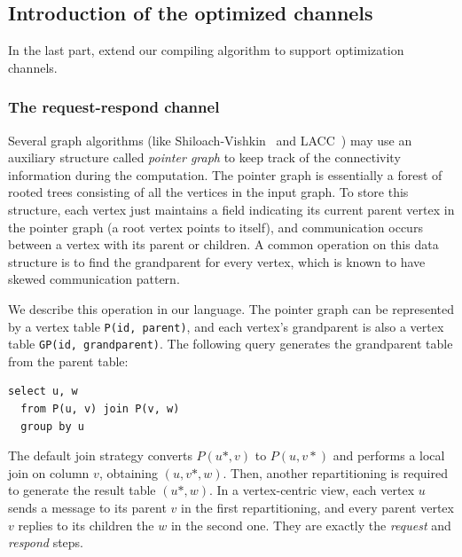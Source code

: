 \documentclass{sokendai_thesis} %
\begin{document}


\subsection{Introduction of the optimized channels}
\label{sec:optimizations}

In the last part, extend our compiling algorithm to support optimization channels.

\subsubsection{The request-respond channel}

Several graph algorithms (like Shiloach-Vishkin~\cite{ShVi82} and LACC~\cite{lacc}) may use an auxiliary structure called \emph{pointer graph} to keep track of the connectivity information during the computation.
The pointer graph is essentially a forest of rooted trees consisting of all the vertices in the input graph.
To store this structure, each vertex just maintains a field indicating its current parent vertex in the pointer graph (a root vertex points to itself), and communication occurs between a vertex with its parent or children.
A common operation on this data structure is to find the grandparent for every vertex, which is known to have skewed communication pattern.


We describe this operation in our language.
The pointer graph can be represented by a vertex table \texttt{P(id, parent)}, and each vertex's grandparent is also a vertex table \texttt{GP(id, grandparent)}.
The following query generates the grandparent table from the parent table:
\begin{lstlisting}[language=sql-graph]
  select u, w
  from P(u, v) join P(v, w)
  group by u
\end{lstlisting}
The default join strategy converts $P(u*,v)$ to $P(u,v*)$ and performs a local join on column $v$, obtaining $(u,v*,w)$.
Then, another repartitioning is required to generate the result table $(u*,w)$.
In a vertex-centric view, each vertex $u$ sends a message to its parent $v$ in the first repartitioning, and every parent vertex $v$ replies to its children the $w$ in the second one.
They are exactly the \emph{request} and \emph{respond} steps.
\end{document}
